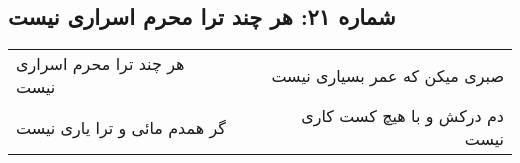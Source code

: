 \begin{center}
\section*{شماره ۲۱: هر چند ترا محرم اسراری نیست}
\label{sec:021}
\begin{longtable}{l p{0.5cm} r}
هر چند ترا محرم اسراری نیست
&&
صبری میکن که عمر بسیاری نیست
\\
گر همدم مائی و ترا یاری نیست
&&
دم درکش و با هیچ کست کاری نیست
\\
\end{longtable}
\end{center}
